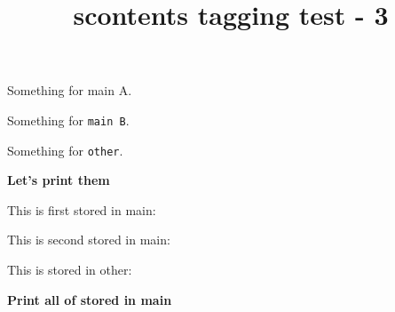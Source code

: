 \documentclass{article}
\title{scontents tagging test - 3}
\begin{document}
\begin{scontents}[store-env=main]
Something for main A.
\end{scontents}

\begin{scontents}[store-env=main]
Something for \verb|main B|.
\end{scontents}

\begin{scontents}[store-env=other]
Something for \verb|other|.
\end{scontents}

\textbf{Let's print them}

This is first stored in main: \par
This is second stored in main: \par
This is stored in other: 

\textbf{Print all of stored in main}\par
{}
\end{document}
